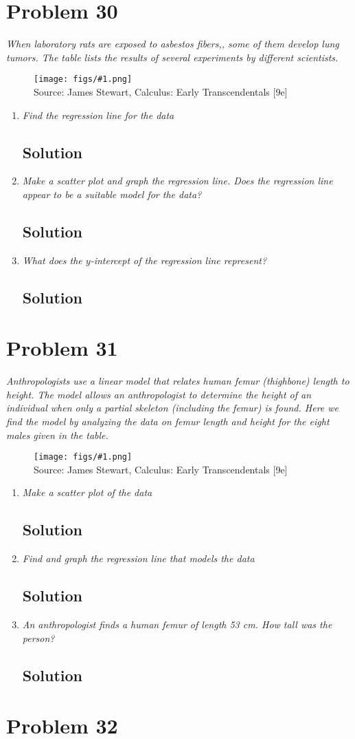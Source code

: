 \documentclass[11pt]{article}
\newcommand{\soln}{\subsection*}
\newcommand{\qn}{\textit}
\newcommand{\imagesource}[1]{{\footnotesize Source: #1}}
\newcommand{\imgqn}[1]{
	\begin{figure}[H]
		\centering
		\texttt{[image: figs/\#1.png]}\\
		\imagesource{James Stewart, Calculus: Early Transcendentals [9e]}
	\end{figure}
}
\begin{document}
\section*{Problem 30}

\qn{When laboratory rats are exposed to asbestos fibers,, some of them develop lung tumors. The table lists the results of several experiments by different scientists.}

\imgqn{1.2.30}

\begin{enumerate}
	\item \qn{Find the regression line for the data}
	\soln{Solution}
	
	\item \qn{Make a scatter plot and graph the regression line. Does the regression line appear to be a suitable model for the data?}
	\soln{Solution}
	
	\item \qn{What does the $y$-intercept of the regression line represent?}
	\soln{Solution}
\end{enumerate}

\section*{Problem 31}

\qn{Anthropologists use a linear model that relates human femur (thighbone) length to height. The model allows an anthropologist to determine the height of an individual when only a partial skeleton (including the femur) is found. Here we find the model by analyzing the data on femur length and height for the eight males given in the table.}

\imgqn{1.2.31}

\begin{enumerate}
	\item \qn{Make a scatter plot of the data}
	\soln{Solution}
	
	\item \qn{Find and graph the regression line that models the data}
	\soln{Solution}
	
	\item \qn{An anthropologist finds a human femur of length 53 cm. How tall was the person?}
	\soln{Solution}
\end{enumerate}

\section*{Problem 32}
\end{document}
